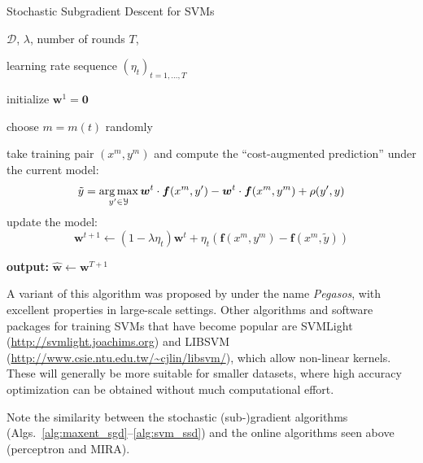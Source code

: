 \begin{algorithm}[t]

   \caption{Stochastic Subgradient Descent for SVMs \label{alg:svm_ssd}}

\begin{algorithmic}[1]

    $\mathcal{D}$, $\lambda$, number of rounds $T$,

   learning rate sequence $(\eta_t)_{t = 1,\ldots,T}$

   \STATE initialize $\boldsymbol{w}^1 = \mathbf{0}$

	\STATE choose $m = m(t)$ randomly

	\STATE take training pair $(x^m, y^m)$ and compute the ``cost-augmented prediction'' under the current model:
	$$\tilde{y} = \operatorname*{arg\,max}_{y' \in \mathcal{Y}} \boldsymbol{w}^t \cdot \boldsymbol{f}(x^m,y') - \boldsymbol{w}^t \cdot \boldsymbol{f}(x^m,y^m) + \rho(y',y)$$ 
	\STATE update the model: 
	$$\boldsymbol{w}^{t+1} \leftarrow (1-\lambda \eta_t) \boldsymbol{w}^{t} + \eta_t \left( \boldsymbol{f}(x^{m},y^{m}) 
	- \boldsymbol{f}(x^{m},\tilde{y})\right)$$
	\ENDFOR

   \STATE \textbf{output:} $\hat{\boldsymbol{w}} \leftarrow \boldsymbol{w}^{T+1}$

\end{algorithmic}

\end{algorithm}


A variant of this algorithm was proposed by \citet{ShalevShwartz2007ICML} under the name \emph{Pegasos}, with excellent properties in large-scale settings. 
Other algorithms and software packages for training SVMs that have become popular are SVMLight (\url{http://svmlight.joachims.org}) 
and LIBSVM (\url{http://www.csie.ntu.edu.tw/~cjlin/libsvm/}), which allow non-linear kernels. These will generally be more suitable for smaller datasets, 
where high accuracy optimization can be obtained without much computational effort. 


\begin{remark}
Note the similarity 
between the stochastic (sub-)gradient algorithms (Algs.~\ref{alg:maxent_sgd}--\ref{alg:svm_ssd}) 
and the online algorithms seen above (perceptron and MIRA). 
\end{remark}


